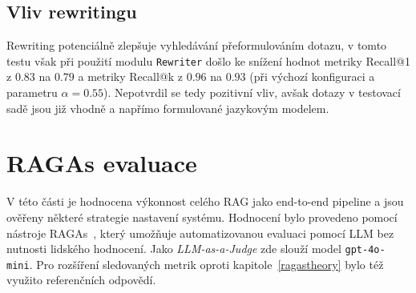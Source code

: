 \subsection{Vliv rewritingu}
Rewriting potenciálně zlepšuje vyhledávání přeformulováním dotazu, v tomto testu však při použití modulu \texttt{Rewriter} došlo ke snížení hodnot metriky Recall@1 z $0.83$ na $0.79$ a metriky Recall@k z $0.96$ na $0.93$ (při výchozí konfiguraci a parametru $\alpha=0.55$). Nepotvrdil se tedy pozitivní vliv, avšak dotazy v testovací sadě jsou již vhodně a napřímo formulované jazykovým modelem.




\section{RAGAs evaluace}
V této části je hodnocena výkonnost celého RAG jako end-to-end pipeline a jsou ověřeny některé strategie nastavení systému. Hodnocení bylo provedeno pomocí nástroje RAGAs~\cite{ragas}, který umožňuje automatizovanou evaluaci pomocí LLM bez nutnosti lidského hodnocení. Jako \textit{LLM-as-a-Judge} zde slouží model \texttt{gpt-4o-mini}. Pro rozšíření sledovaných metrik oproti kapitole~\ref{ragastheory} bylo též využito referenčních odpovědí.

